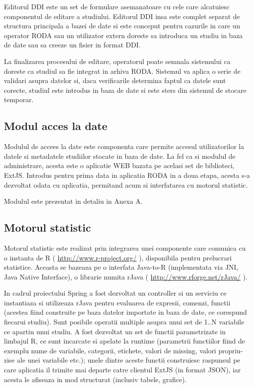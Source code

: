 \documentclass[a4paper, 10pt]{article}
\begin{document}
{Editorul DDI este un set de formulare asemanatoare cu cele care alcatuiesc
componentul de editare a studiului. Editorul DDI insa este complet
separat de structura principala a bazei de date si este conceput pentru
cazurile in care un operator RODA sau un utilizator extern doreste
sa introduca un studiu in baza de date sau sa creeze un fisier in
format DDI. 

La finalizarea procesului de editare, operatorul poate semnala sistemului
ca doreste ca studiul sa fie integrat in arhiva RODA. Sistemul va
aplica o serie de validari asupra datelor si, daca verificarile determina
faptul ca datele sunt corecte, studiul este introdus in baza de date
si este sters din sistemul de stocare temporar. 

\subsection{Modul acces la date}

Modulul de accees la date este componenta care permite accesul utilizatorilor
la datele si metadatele studiilor stocate in baza de date. La fel
ca si modulul de administrare, acesta este o aplicatie WEB bazata
pe acelasi set de biblioteci, ExtJS. Introdus pentru prima data in
aplicatia RODA in a doua etapa, acesta s-a dezvoltat
odata cu aplicatia, permitand acum si interfatarea cu motorul statistic. 

Modulul este prezentat in detaliu in Anexa A. 

\subsection{Motorul statistic}

Motorul statistic este realizat prin integrarea unei componente care comunica cu o instanta de R ( \url{http://www.r-project.org/} ), 
disponibila pentru prelucrari statistice.
Aceasta se bazeaza pe o interfata Java-to-R (implementata via JNI, Java Native Interface), 
o librarie numita rJava ( \url{http://www.rforge.net/rJava/} ).

In cadrul proiectului Spring a fost dezvoltat un controller si un serviciu ce instantiaza si utilizeaza rJava 
pentru evaluarea de expresii, comenzi, functii 
(acestea fiind construite pe baza datelor importate in baza de date, ce corespund fiecarui studiu). 
Sunt posibile operatii multiple asupra unui set de 1..N variabile ce apartin unui studiu.
A fost dezvoltat un set de functii parametrizate in limbajul R, ce sunt incarcate si apelate la runtime 
(parametrii functiilor fiind de exemplu nume de variabile, categorii, etichete, valori de missing, valori propriu-zise ale unei variabile etc.);
unele dintre aceste functii construiesc raspunsul pe care aplicatia il trimite mai departe catre clientul ExtJS (in format JSON), 
iar acesta le afiseaza in mod structurat (inclusiv tabele, grafice).

}
\end{document}
